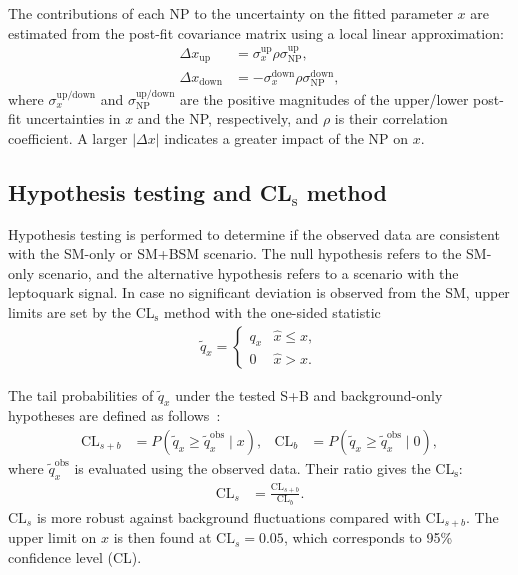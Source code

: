 The contributions of each NP to the uncertainty on the fitted parameter $x$ are estimated from the post-fit covariance matrix using a local linear approximation:
\begin{align}
 \Delta x_{\mathrm{up}}
 &=\sigma_x^{\mathrm{up}}\rho\sigma_{\mathrm{NP}}^{\mathrm{up}},
 \nonumber\\
 \Delta x_{\mathrm{down}}
 &=-\sigma_x^{\mathrm{down}}\rho\sigma_{\mathrm{NP}}^{\mathrm{down}},
 \label{eq:ch10_np_impact}
\end{align}
where $\sigma_x^{\mathrm{up/down}}$ and $\sigma_{\mathrm{NP}}^{\mathrm{up/down}}$ are the positive magnitudes of the upper/lower post-fit uncertainties in $x$ and the NP, respectively, and $\rho$ is their correlation coefficient.
A larger $|\Delta x|$ indicates a greater impact of the NP on $x$.

\subsection{Hypothesis testing and CL$_{\mathrm{s}}$ method}
Hypothesis testing is performed to determine if the observed data are consistent with the SM-only or SM+BSM scenario.
The null hypothesis refers to the SM-only scenario, and the alternative hypothesis refers to a scenario with the leptoquark signal.
In case no significant deviation is observed from the SM, upper limits are set by the CL$_{\mathrm{s}}$ method with the one-sided statistic
\begin{align*}
 \tilde q_x=\begin{cases}
 q_x &\hat{x}\leq x,\\
 0 &\hat{x}>x.
 \end{cases}
\end{align*}

The tail probabilities of $\tilde q_x$ under the tested S+B and background-only hypotheses are defined as follows~\cite{Read:2002hq}:
\begin{align*}
 \mathrm{CL}_{s+b}&=P(\tilde q_x\geq\tilde q_x^{\mathrm{obs}}\mid x),&
 \mathrm{CL}_{b}&=P(\tilde q_x\geq\tilde q_x^{\mathrm{obs}}\mid0),
\end{align*}
where $\tilde q_x^{\mathrm{obs}}$ is evaluated using the observed data.
Their ratio gives the CL$_{\mathrm{s}}$:
\begin{align*}
 \mathrm{CL}_{s}&=\frac{\mathrm{CL}_{s+b}}{\mathrm{CL}_{b}}.
\end{align*}
$\mathrm{CL}_{s}$ is more robust against background fluctuations compared with $\mathrm{CL}_{s+b}$.
The upper limit on $x$ is then found at $\mathrm{CL}_{s}=0.05$, which corresponds to 95\% confidence level (CL).

